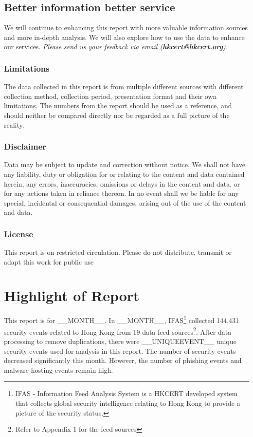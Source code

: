 \documentclass[__FONT_SIZE__]{extarticle}
\begin{document}
\subsection*{Better information better service}

We will continue to enhancing this report with more valuable information sources and more in-depth analysis. We will also explore how to use the data to enhance our services. \textit{Please send us your feedback via email (\textbf{hkcert@hkcert.org}).}

\subsubsection*{Limitations}
The data collected in this report is from multiple different sources with different collection method, collection period, presentation format and their own limitations. The numbers from the report should be used as a reference, and should neither be compared directly nor be regarded as a full picture of the reality. 

\subsubsection*{Disclaimer}
Data may be subject to update and correction without notice. We shall not have any liability, duty or obligation for or relating to the content and data contained herein, any errors, inaccuracies, omissions or delays in the content and data, or for any actions taken in reliance thereon.  In no event shall we be liable for any special, incidental or consequential damages, arising out of the use of the content and data.

\subsubsection*{License}
This report is on restricted circulation. Please do not distribute, transmit or adapt this work for public use

\newpage
\tableofcontents

\newpage
{}
\section*{Highlight of Report}
This report is for __MONTH__.
In __MONTH__, IFAS\footnote{IFAS - Information Feed Analysis System is a HKCERT developed system that collects global security intelligence relating to Hong Kong to provide a picture of the security status.} collected 144,431 security events related to Hong Kong from 19 data feed sources\footnote{Refer to Appendix 1 for the feed sources}. After data processing to remove duplications, there were __UNIQUEEVENT__ unique security events used for analysis in this report.
The number of security events decreased significantly this month. However, the number of phishing events and malware hosting events remain high.
\end{document}

